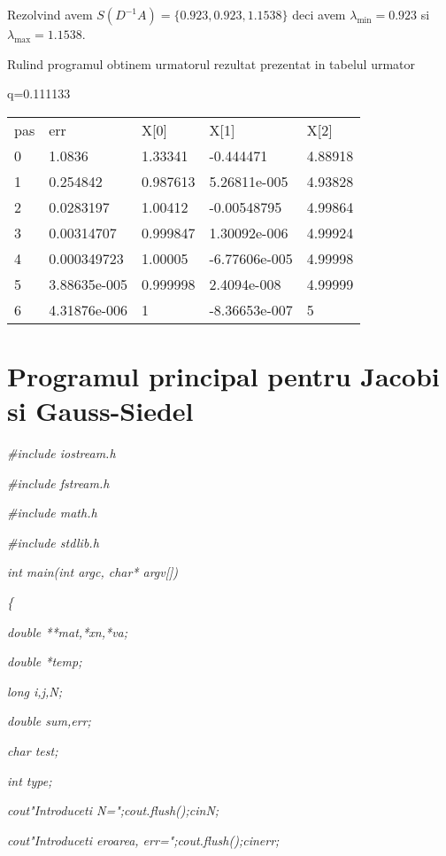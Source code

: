 \documentclass[a4paper,twoside]{book}
\begin{document}
Rezolvind avem $S(D^{-1}A)=\{0.923,0.923,1.1538\}$ deci avem $\lambda _{\min
}=0.923$ si $\lambda _{\max }=1.1538$.

Rulind programul obtinem urmatorul rezultat prezentat in tabelul urmator

q=0.111133

\begin{tabular}{lllll}
pas & err & X[0] & X[1] & X[2] \\ 
0 & 1.0836 & 1.33341 & -0.444471 & 4.88918 \\ 
1 & 0.254842 & 0.987613 & 5.26811e-005 & 4.93828 \\ 
2 & 0.0283197 & 1.00412 & -0.00548795 & 4.99864 \\ 
3 & 0.00314707 & 0.999847 & 1.30092e-006 & 4.99924 \\ 
4 & 0.000349723 & 1.00005 & -6.77606e-005 & 4.99998 \\ 
5 & 3.88635e-005 & 0.999998 & 2.4094e-008 & 4.99999 \\ 
6 & 4.31876e-006 & 1 & -8.36653e-007 & 5%
\end{tabular}

\chapter{Programul principal pentru Jacobi si Gauss-Siedel}

\bigskip

\textit{\#include \TEXTsymbol{<}iostream.h\TEXTsymbol{>}}

\textit{\#include \TEXTsymbol{<}fstream.h\TEXTsymbol{>}}

\textit{\#include \TEXTsymbol{<}math.h\TEXTsymbol{>}}

\textit{\#include \TEXTsymbol{<}stdlib.h\TEXTsymbol{>}}

\textit{int main(int argc, char* argv[])}

\textit{\{}

\textit{\qquad double **mat,*xn,*va;}

\textit{\qquad double *temp;}

\textit{\qquad long i,j,N;}

\textit{\qquad double sum,err;}

\textit{\qquad char test;}

\textit{\qquad int type;}

\textit{\qquad cout\TEXTsymbol{<}\TEXTsymbol{<}"Introduceti
N=";cout.flush();cin\TEXTsymbol{>}\TEXTsymbol{>}N;}

\textit{\qquad cout\TEXTsymbol{<}\TEXTsymbol{<}"Introduceti eroarea,
err=";cout.flush();cin\TEXTsymbol{>}\TEXTsymbol{>}err;}
\end{document}
